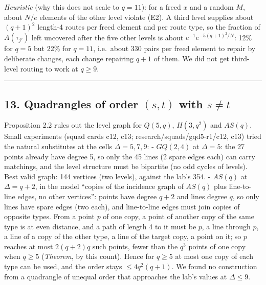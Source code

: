 \documentclass[
  11pt,
]{article}
\begin{document}
\emph{Heuristic} (why this does not scale to \(q = 11\)): for a freed
\(x\) and a random \(M\), about \(N/e\) elements of the other level
violate (E2). A third level supplies about \((q+1)^2\) length-4 routes
per freed element and per route type, so the fraction of
\(A(\tau_{j'})\) left uncovered after the five other levels is about
\(e^{-1}e^{-5(q+1)^2/N}\): 12\% for \(q=5\) but 22\% for \(q = 11\),
i.e.~about 330 pairs per freed element to repair by deliberate changes,
each change repairing \(q+1\) of them. We did not get third-level
routing to work at \(q\ge 9\).

\begin{center}\rule{0.5\linewidth}{0.5pt}\end{center}

\hypertarget{quadrangles-of-order-st-with-sne-t}{%
\subsection{\texorpdfstring{13. Quadrangles of order \((s,t)\) with
\(s\ne t\)}{13. Quadrangles of order (s,t) with s\textbackslash ne t}}\label{quadrangles-of-order-st-with-sne-t}}

Proposition 2.2 rules out the level graph for \(Q(5,q)\), \(H(3,q^2)\)
and \(AS(q)\). Small experiments (squad cards c12, c13;
research/squads/gqd5-r1/c12, c13) tried the natural substitutes at the
cells \(\Delta = 5,7,9\): - \(GQ(2,4)\) at \(\Delta = 5\): the 27 points
already have degree 5, so only the 45 lines (2 spare edges each) can
carry matchings, and the level structure must be bipartite (no odd
cycles of levels). Best valid graph: 144 vertices (two levels), against
the lab's 354. - \(AS(q)\) at \(\Delta = q+2\), in the model ``copies of
the incidence graph of \(AS(q)\) plus line-to-line edges, no other
vertices'': points have degree \(q+2\) and lines degree \(q\), so only
lines have spare edges (two each), and line-to-line edges must join
copies of opposite types. From a point \(p\) of one copy, a point of
another copy of the same type is at even distance, and a path of length
4 to it must be \(p\), a line through \(p\), a line of a copy of the
other type, a line of the target copy, a point on it; so \(p\) reaches
at most \(2(q+2)q\) such points, fewer than the \(q^3\) points of one
copy when \(q\ge 5\) (\emph{Theorem}, by this count). Hence for
\(q\ge 5\) at most one copy of each type can be used, and the order
stays \(\le 4q^2(q+1)\). We found no construction from a quadrangle of
unequal order that approaches the lab's values at \(\Delta\le 9\).
\end{document}
